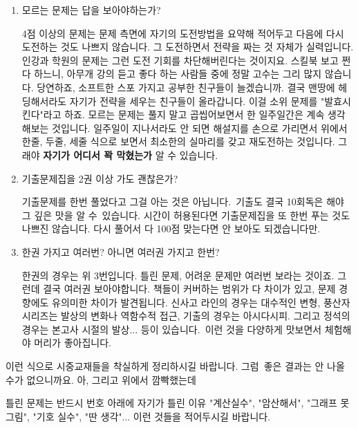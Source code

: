 \begin{enumerate}
    \item  모르는 문제는 답을 보아야하는가?
    \vspace{5mm}

    4점 이상의 문제는 문제 측면에 자기의 도전방법을 요약해 적어두고 다음에 다시 도전하는 것도 나쁘지 않습니다.
    그 도전하면서 전략을 짜는 것 자체가 실력입니다. 인강과 학원의 문제는 그런 도전 기회를 차단해버린다는 것이지요.
    스킬북 보고 쩐다 하느니, 아무개 강의 듣고 좋다 하는 사람들 중에 정말 고수는 그리 많지 않습니다.
    당연하죠, 소프트한 스포 가지고 공부한 친구들이 늘겠습니까. 결국 맨땅에 헤딩해서라도 자기가 전략을 세우는 친구들이 올라갑니다.
    이걸 소위 문제를 "발효시킨다"라고 하죠. 모르는 문제는 풀지 말고 곱씹어보면서 한 일주일간은 계속 생각해보는 것입니다.
    일주일이 지나서라도 안 되면 해설지를 손으로 가리면서 위에서 한줄, 두줄, 세줄 식으로 보면서 최소한의 실마리를 갖고 재도전하는 것입니다.
    그래야 \textbf{자기가 어디서 꽉 막혔는가} 알 수 있습니다.
    \vspace{5mm}

    \item 기출문제집을 2권 이상 가도 괜찮은가?
    \vspace{5mm}

    기출문제를 한번 풀었다고 그걸 아는 것은 아닙니다. 기출도 결국 10회독은 해야 그 깊은 맛을 알 수 있습니다.
    시간이 허용된다면 기출문제집을 또 한번 푸는 것도 나쁘진 않습니다. 다시 풀어서 다 100점 맞는다면 안 보아도 되겠습니다만.
    \vspace{5mm}

    \item 한권 가지고 여러번? 아니면 여러권 가지고 한번?
    \vspace{5mm}

    한권의 경우는 위 3번입니다. 틀린 문제, 어려운 문제만 여러번 보라는 것이죠.
    그런데 결국 여러권 보아야합니다. 책들이 커버하는 범위가 다 차이가 있고, 문제 경향에도 유의미한 차이가 발견됩니다.
    신사고 라인의 경우는 대수적인 변형, 풍산자 시리즈는 발상의 변화나 역함수적 접근, 기출의 경우는 아시다시피.
    그리고 정석의 경우는 본고사 시절의 발상... 등이 있습니다. 이런 것을 다양하게 맛보면서 체험해야 머리가 좋아집니다.
    \vspace{5mm}
\end{enumerate}
이런 식으로 시중교재들을 착실하게 정리하시길 바랍니다. 그럼 좋은 결과는 안 나올 수가 없으니까요.
아, 그리고 위에서 깜빡했는데
\vspace{5mm}

틀린 문제는 반드시 번호 아래에 자기가 틀린 이유
"계산실수", "암산해서", "그래프 못 그림", "기호 실수", "딴 생각"... 이런 것들을 적어두시길 바랍니다.
\vspace{5mm}






